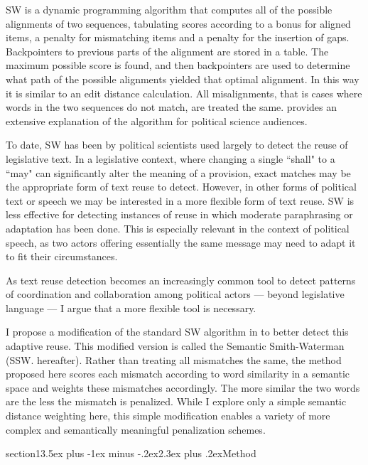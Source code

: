 \documentclass[11pt]{article}
\makeatletter
\renewcommand{\section}{\@startsection 
{section}{1}{\z@}{3.5ex plus -1ex minus -.2ex}{2.3ex plus .2ex}{\centering\normalsize\bf}}
\makeatother
\begin{document}
\begin{flushleft}
SW is a dynamic programming algorithm that computes all of the possible alignments of two sequences, tabulating scores according to a bonus for aligned items, a penalty for mismatching items and a penalty for the insertion of gaps. Backpointers to previous parts of the alignment are stored in a table. The maximum possible score is found, and then backpointers are used to determine what path of the possible alignments yielded that optimal alignment. In this way it is similar to an edit distance calculation. All misalignments, that is cases where words in the two sequences do not match, are treated the same. \cite{Fridolin2017text} provides an extensive explanation of the algorithm for political science audiences.

To date, SW has been by political scientists used largely to detect the reuse of legislative text. In a legislative context, where changing a single ``shall" to a ``may" can significantly alter the meaning of a provision, exact matches may be the appropriate form of text reuse to detect. However, in other forms of political text or speech we may be interested in a more flexible form of text reuse. SW is less effective for detecting instances of reuse in which moderate paraphrasing or adaptation has been done. This is especially relevant in the context of political speech, as two actors offering essentially the same message may need to adapt it to fit their circumstances. 

As text reuse detection becomes an increasingly common tool to detect patterns of coordination and collaboration among political actors --- beyond legislative language --- I argue that a more flexible tool is necessary. 


I propose a modification of the standard SW algorithm in to better detect this adaptive reuse. This modified version is called the Semantic Smith-Waterman (SSW. hereafter). Rather than treating all mismatches the same, the method proposed here scores each mismatch according to word similarity in a semantic space and weights these mismatches accordingly. The more similar the two words are the less the mismatch is penalized. While I explore only a simple semantic distance weighting here, this simple modification enables a variety of more complex and semantically meaningful penalization schemes. 


\section{Method}



\end{flushleft}
\end{document}
